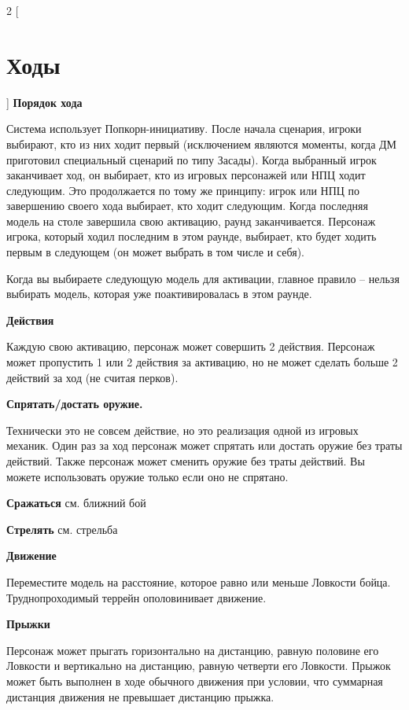 \begin{multicols}{2}
    [
    \section{Ходы}
    ]
    \textbf{Порядок хода}

    Система использует Попкорн-инициативу. После начала сценария, игроки выбирают, кто из них ходит первый 
    (исключением являются моменты, когда ДМ приготовил специальный сценарий по типу Засады). Когда выбранный 
    игрок заканчивает ход, он выбирает, кто из игровых персонажей или НПЦ ходит следующим. Это продолжается 
    по тому же принципу: игрок или НПЦ по завершению своего хода выбирает, кто ходит следующим. Когда последняя
     модель на столе завершила свою активацию, раунд заканчивается. Персонаж игрока, который ходил последним
      в этом раунде, выбирает, кто будет ходить первым в следующем (он может выбрать в том числе и себя).

    Когда вы выбираете следующую модель для активации, главное правило – нельзя выбирать модель, которая уже 
    поактивировалась в этом раунде.

    \textbf{Действия}

    Каждую свою активацию, персонаж может совершить 2 действия. Персонаж может пропустить 1 или 2 действия за 
    активацию, но не может сделать больше 2 действий за ход (не считая перков).

    \textbf{Спрятать/достать оружие.}

    Технически это не совсем действие, но это реализация одной из игровых механик. Один раз за ход персонаж может 
    спрятать или достать оружие без траты действий. Также персонаж может сменить оружие без траты действий. Вы можете
    использовать оружие только если оно не спрятано.

    \textbf{Сражаться}
    см. ближний бой

    \textbf{Стрелять}
    см. стрельба

    \textbf{Движение}

    Переместите модель на расстояние, которое равно или меньше Ловкости бойца. Труднопроходимый террейн ополовинивает движение.

    \textbf{Прыжки}

    Персонаж может прыгать горизонтально на дистанцию, равную половине его Ловкости и вертикально на дистанцию, равную четверти 
    его Ловкости. Прыжок может быть выполнен в ходе обычного движения при условии, что суммарная дистанция движения не превышает
    дистанцию прыжка.


\end{multicols}
